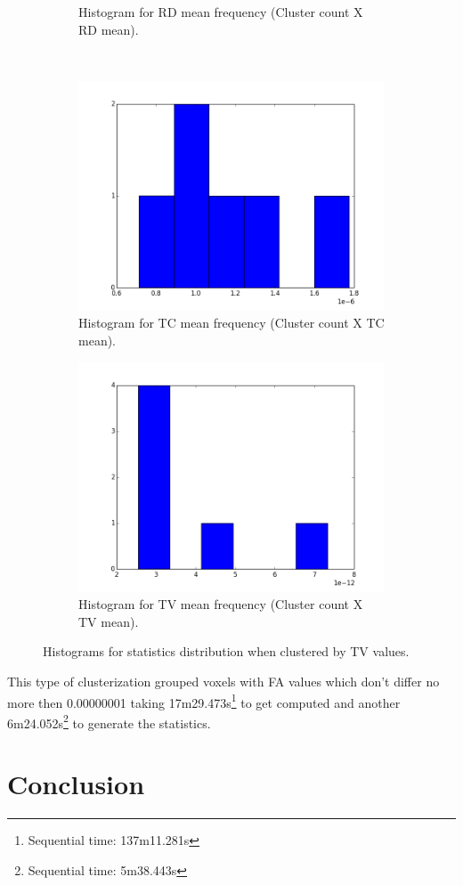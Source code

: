 \documentclass[a4paper,11pt]{report}
\begin{document}
\begin{figure}[!ht]
\begin{subfigure}[t]{.49\textwidth}
        \caption{Histogram for RD mean frequency (Cluster count X RD mean).}
        \label{subfig:fa_hist_rd}
      \end{subfigure}\hfill\\
      \begin{subfigure}[t]{.49\textwidth}
        \includegraphics[width=1\linewidth]{img/histograms/tv_clustered_fa_mask_tc_means_hist.png}
        \caption{Histogram for TC mean frequency (Cluster count X TC mean).}
        \label{subfig:fa_hist_tc}
      \end{subfigure}\hfill%
      \begin{subfigure}[t]{.49\textwidth}
        \includegraphics[width=1\linewidth]{img/histograms/tv_clustered_fa_mask_tv_means_hist.png}
        \caption{Histogram for TV mean frequency (Cluster count X TV mean).}
        \label{subfig:fa_hist_tv}
      \end{subfigure}\hfill

      \caption{Histograms for statistics distribution when clustered by TV values.}
      \label{fig:fa-histograms}
    \end{figure}

    This type of clusterization grouped voxels with FA values which don't differ no more then 0.00000001 taking 17m29.473s\footnote{Sequential time: 137m11.281s} to get computed and another 6m24.052s\footnote{Sequential time: 5m38.443s} to generate the statistics.

\chapter{Conclusion}
\end{document}
